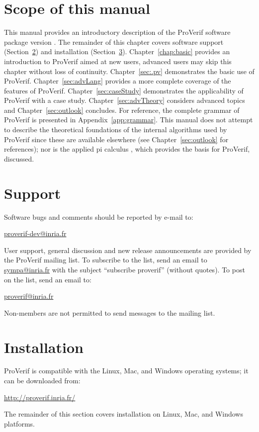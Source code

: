 \documentclass{book}
\begin{document}
\section{Scope of this manual}

This manual provides an introductory description of the ProVerif software package version \V. The remainder of this chapter covers software support (Section~\ref{sec:support}) and installation (Section~\ref{sec:install}). Chapter~\ref{chap:basic} provides an introduction to ProVerif aimed at new users, advanced users may skip this chapter without loss of continuity. Chapter~\ref{sec:.pv} demonstrates the basic use of ProVerif. Chapter~\ref{sec:advLang} provides a more complete coverage of the features of ProVerif. Chapter~\ref{sec:caseStudy} demonstrates the applicability of ProVerif with a case study. Chapter~\ref{sec:advTheory} considers advanced topics and Chapter~\ref{sec:outlook} concludes.
%
For reference, the complete grammar of ProVerif is presented in Appendix~\ref{app:grammar}.
This manual does not attempt to describe the theoretical foundations of the internal algorithms used by ProVerif since these are available elsewhere (see Chapter~\ref{sec:outlook} for references); nor is the applied pi calculus \cite{Abadi2001, Smyth2010, AbadiBlanchetFournetJACM17}, which provides the basis for ProVerif, discussed.

\section{Support}\label{sec:support}

Software bugs and comments should be reported by e-mail to:
\begin{center}
	\url{proverif-dev@inria.fr}
\end{center}
User support, general discussion and new release announcements are provided by the ProVerif mailing list. To subscribe to the list, send an email to \url{sympa@inria.fr} with the subject ``subscribe proverif'' (without quotes). To post on the list, send an email to:
\begin{center}
	\url{proverif@inria.fr}
\end{center}
Non-members are not permitted to send messages to the mailing list.

\section{Installation}\label{sec:install}

ProVerif is compatible with the Linux, Mac, and Windows operating systems;
it can be downloaded from:
\begin{center}
	\url{http://proverif.inria.fr/}
\end{center}
The remainder of this section covers installation on Linux, Mac, and Windows platforms.
\end{document}
